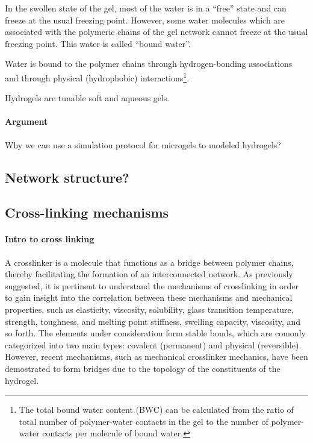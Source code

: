 In the swollen state of the gel, most of the water is in a “free” state and can freeze at the usual freezing point. 
However, some water molecules which are associated with the polymeric chains of the gel network cannot freeze at the usual freezing point. 
This water is called “bound water”\citep{lelePredictionsBoundWater1997}.

Water is bound to the polymer chains through hydrogen-bonding associations and through physical (hydrophobic) interactions\footnote{The total bound water content (BWC) can be calculated from the ratio of total number of polymer-water contacts in the gel to the number of polymer-water contacts per molecule of bound water.}\citep{lelePredictionsBoundWater1997}. 

Hydrogels are tunable soft and aqueous gels\citep{bonyadiReviewFrictionLubrication2020}.


\paragraph{Argument} Why we can use a simulation protocol for microgels to modeled hydrogels?

\subsection{Network structure?}


\subsection{Cross-linking mechanisms}

\paragraph{Intro to cross linking}
A crosslinker is a molecule that functions as a bridge between polymer chains, thereby facilitating the formation of an interconnected network.
As previously suggested, it is pertinent to understand the mechanisms of crosslinking in order to gain insight into the correlation between these mechanisms and mechanical properties, such as elasticity, viscosity, solubility, glass transition temperature, strength, toughness, and melting point stiffness, swelling capacity, viscosity, and so forth\citep{priyaComprehensiveReviewHydrogel2024}.
The elements under consideration form stable bonds, which are comonly categorized into two main types: covalent (permanent) and physical (reversible)\citep{bustamantetorresHydrogelsClassificationAccording2021}.
However, recent mechanisms, such as mechanical crosslinker mechanics, have been demostrated to form bridges due to the topology of the constituents of the hydrogel.

